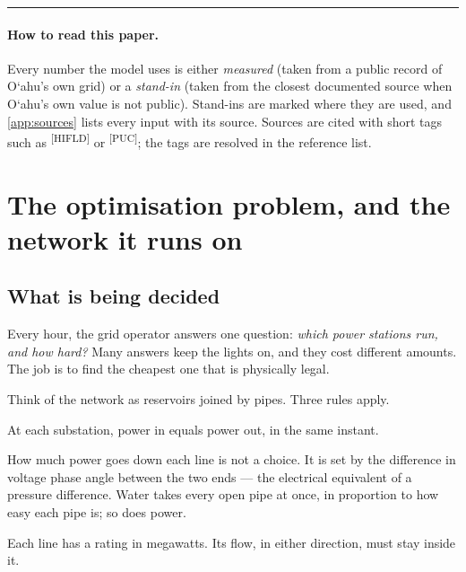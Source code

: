 \documentclass[11pt,a4paper]{article}
\newcommand{\okina}{\textquoteleft}
\newcommand{\Oahu}{O\okina ahu}
\newcommand{\src}[1]{\textsuperscript{[#1]}}
\begin{document}
\vspace{0.4em}
\hrule
\vspace{1.0em}

\paragraph{How to read this paper.} Every number the model uses is either
\emph{measured} (taken from a public record of \Oahu's own grid) or a
\emph{stand-in} (taken from the closest documented source when \Oahu's own value is
not public). Stand-ins are marked where they are used, and
\cref{app:sources} lists every input with its source. Sources are cited with short
tags such as \src{HIFLD} or \src{PUC}; the tags are resolved in the reference list.

\section{The optimisation problem, and the network it runs on}
\label{sec:model}

\subsection{What is being decided}

Every hour, the grid operator answers one question: \emph{which power stations run,
and how hard?} Many answers keep the lights on, and they cost different amounts. The
job is to find the cheapest one that is physically legal.

Think of the network as reservoirs joined by pipes. Three rules apply.

\begin{description}[leftmargin=1.5em,style=nextline]
  \item[Nothing is stored.] At each substation, power in equals power out, in the same
        instant.
  \item[You cannot steer the flow.] How much power goes down each line is not a choice.
        It is set by the difference in voltage phase angle between the two ends --- the
        electrical equivalent of a pressure difference. Water takes every open pipe at
        once, in proportion to how easy each pipe is; so does power.
  \item[Every pipe has a width.] Each line has a rating in megawatts. Its flow, in
        either direction, must stay inside it.
\end{description}
\end{document}
